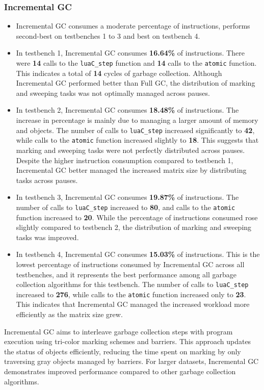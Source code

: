 \documentclass[10pt]{article}
\begin{document}
\subsubsection{Incremental GC}
\begin{itemize}
    \item Incremental GC consumes a moderate percentage of instructions, performs second-best on testbenches 1 to 3 and best on testbench 4.
    \item In testbench 1, Incremental GC consumes \textbf{16.64\%} of instructions. There were \textbf{14} calls to the \texttt{luaC\_step} function and \textbf{14} calls to the \texttt{atomic} function. This indicates a total of \textbf{14} cycles of garbage collection. Although Incremental GC performed better than Full GC, the distribution of marking and sweeping tasks was not optimally managed across pauses.
    \item In testbench 2, Incremental GC consumes \textbf{18.48\%} of instructions. The increase in percentage is mainly due to managing a larger amount of memory and objects. The number of calls to \texttt{luaC\_step} increased significantly to \textbf{42}, while calls to the \texttt{atomic} function increased slightly to \textbf{18}. This suggests that marking and sweeping tasks were not perfectly distributed across pauses. Despite the higher instruction consumption compared to testbench 1, Incremental GC better managed the increased matrix size by distributing tasks across pauses.
    \item In testbench 3, Incremental GC consumes \textbf{19.87\%} of instructions. The number of calls to \texttt{luaC\_step} increased to \textbf{80}, and calls to the \texttt{atomic} function increased to \textbf{20}. While the percentage of instructions consumed rose slightly compared to testbench 2, the distribution of marking and sweeping tasks was improved.
    \item In testbench 4, Incremental GC consumes \textbf{15.03\%} of instructions. This is the lowest percentage of instructions consumed by Incremental GC across all testbenches, and it represents the best performance among all garbage collection algorithms for this testbench. The number of calls to \texttt{luaC\_step} increased to \textbf{276}, while calls to the \texttt{atomic} function increased only to \textbf{23}. This indicates that Incremental GC managed the increased workload more efficiently as the matrix size grew.
\end{itemize}
Incremental GC aims to interleave garbage collection steps with program execution using tri-color marking schemes and barriers. This approach updates the status of objects efficiently, reducing the time spent on marking by only traversing gray objects managed by barriers. For larger datasets, Incremental GC demonstrates improved performance compared to other garbage collection algorithms.
\end{document}
